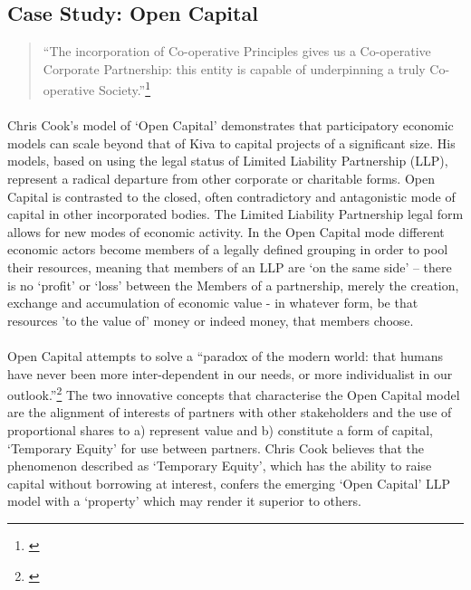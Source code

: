 \documentclass[12pt,a4paper,titlepage]{article}
\begin{document}
\subsection{Case Study: Open Capital}
\singlespacing
\begin{quote}
``The incorporation of Co-operative Principles gives us a Co-operative Corporate Partnership: this entity is capable of underpinning a truly Co-operative Society.''\footnote{\cite[p. 2]{cook:2004cp}}
\end{quote}
\doublespacing

\paragraph{}Chris Cook's model of `Open Capital' demonstrates that participatory economic models can scale beyond that of Kiva to capital projects of a significant size. His models, based on using the legal status of Limited Liability Partnership (LLP), represent a radical departure from other corporate or charitable forms. Open Capital is contrasted to the closed, often contradictory and antagonistic mode of capital in other incorporated bodies. The Limited Liability Partnership legal form allows for new modes of economic activity. In the Open Capital mode different economic actors become members of a legally defined grouping in order to pool their resources, meaning that members of an LLP are `on the same side' – there is no `profit' or `loss' between the Members of a partnership, merely the creation, exchange and accumulation of economic value - in whatever form, be that resources 'to the value of' money or indeed money, that members choose.

\paragraph{}Open Capital attempts to solve a ``paradox of the modern world: that humans have never been more inter-dependent in our needs, or more individualist in our outlook.''\footnote{\cite[p. 6]{cook:2004cp}} The two innovative concepts that characterise the Open Capital model are the alignment of interests of partners with other stakeholders and the use of proportional shares to a) represent value and b) constitute a form of capital, `Temporary Equity' for use between partners. Chris Cook believes that the phenomenon described as `Temporary Equity', which has the ability to raise capital without borrowing at interest, confers the emerging `Open Capital' LLP model with a `property' which may render it superior to others.
\end{document}
